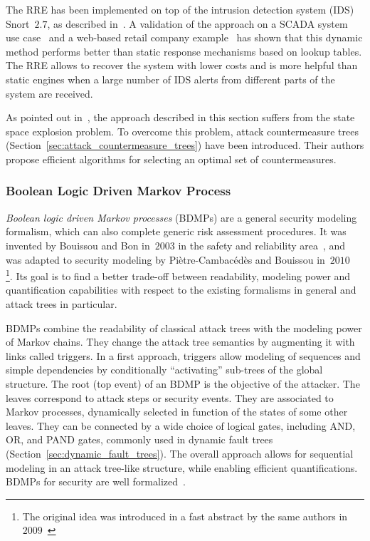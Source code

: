 \documentclass[a4paper]{article}
\begin{document}
The RRE has been implemented on top of the intrusion detection system (IDS)
Snort~$2.7$, as described in~\cite{Zonouz}. A validation of the approach on a
SCADA system use case~\cite{ZoKhSaYa} and a web-based retail  company
example~\cite{ZoShRaKaPfAuIySaCo} has shown that this dynamic method  performs
better than static response mechanisms based on lookup tables. The RRE allows to
recover the system with lower costs and is more helpful than static engines when
a large number of IDS alerts from different parts of the system are received.

As pointed out in~\cite{RoKiTr}, the approach described in this section suffers
from the state space explosion problem. To overcome this problem, attack
countermeasure trees (Section~\ref{sec:attack_countermeasure_trees}) have been
introduced. Their authors propose efficient algorithms for selecting an optimal
set of countermeasures.
\subsubsection{Boolean Logic Driven Markov Process} 
\label{sec:BDMP}

\emph{Boolean logic driven Markov processes} (BDMPs) are a general security
modeling formalism, which can also complete generic risk assessment procedures.
It was invented by Bouissou and Bon in~$2003$ in the safety and reliability
area~\cite{BoBo}, and was adapted to security modeling by
Pi\`{e}tre-Cambac\'{e}d\`{e}s and Bouissou in~$2010$~\cite{PiBo6,PiBo2}
\footnote{The original idea was introduced in a fast abstract by the same
authors in~$2009$~\cite{PiBo3}}. Its goal is to find a better trade-off between
readability, modeling power and quantification capabilities with respect to the
existing formalisms in general and attack trees in particular.

BDMPs combine the readability of classical attack trees with the modeling power
of Markov chains. They change the attack tree semantics by augmenting it with
links called triggers. In a first approach, triggers allow modeling of sequences
and simple dependencies by conditionally ``activating'' sub-trees of the global
structure. The root (top event) of an BDMP is the objective of the attacker. The
leaves correspond to attack steps or security events. They are associated to
Markov processes, dynamically selected in function of the states of some other
leaves. They can be connected by a wide choice of logical gates, including AND,
OR, and PAND gates, commonly used in dynamic fault trees 
(Section~\ref{sec:dynamic_fault_trees}). The overall approach allows for
sequential modeling in an attack tree-like structure, while enabling efficient
quantifications. BDMPs for security are well formalized~\cite{PiBo2}.
\end{document}
